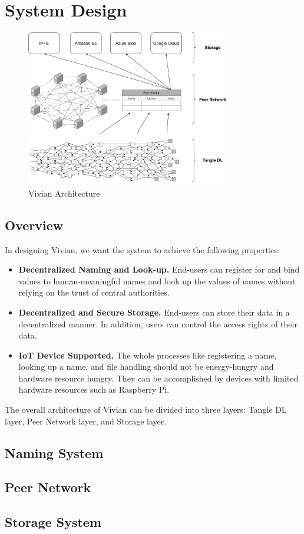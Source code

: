 \section{System Design}
\label{sec:design}

\begin{figure}[t]
    \centering
    \includegraphics[width=0.8\textwidth,trim={0 0 0 0},clip]{figs/vivian_architecture.pdf}
    \caption{Vivian Architecture}
    \label{fig:vivian_architecture}
\end{figure}

\subsection{Overview}
In designing Vivian, we want the system to achieve the following properties:

\begin{itemize}
    \item \textbf{Decentralized Naming and Look-up.} End-users can register for and bind values to human-meaningful names and look up the values of names without relying on the trust of central authorities.
    \item \textbf{Decentralized and Secure Storage.} End-users can store their data in a decentralized manner. In addition, users can control the access rights of their data.
    \item  \textbf{IoT Device Supported.} The whole processes like registering a name, looking up a name, and file handling should not be energy-hungry and hardware resource hungry.
          They can be accomplished by devices with limited hardware resources such as Raspberry Pi.
\end{itemize}

The overall architecture of Vivian can be divided into three layers: Tangle DL layer, Peer Network layer, and Storage layer.

\subsection{Naming System}

\subsection{Peer Network}

\subsection{Storage System}
